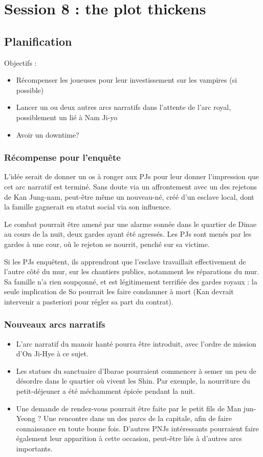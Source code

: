 \documentclass[10pt,a4paper]{book}
\begin{document}
\section{Session 8 : the plot thickens}
\subsection{Planification}
Objectifs :
\begin{itemize}
\item Récompenser les joueuses pour leur investissement sur les vampires (si possible)
\item Lancer un ou deux autres arcs narratifs dans l'attente de l'arc royal, possiblement un lié à Nam Ji-yo
\item Avoir un downtime?
\end{itemize}

\subsubsection{Récompense pour l'enquête}
L'idée serait de donner un os à ronger aux PJs pour leur donner l'impression que cet arc narratif est terminé. Sans doute via un affrontement avec un des rejetons de Kan Jung-nam, peut-être même un nouveau-né, créé d'un esclave local, dont la famille gagnerait en statut social via son influence. 

Le combat pourrait être amené par une alarme sonnée dans le quartier de Dinae au cours de la nuit, deux gardes ayant été agressés. Les PJs sont menés par les gardes à une cour, où le rejeton se nourrit, penché sur sa victime.

Si les PJs enquêtent, ils apprendront que l'esclave travaillait effectivement de l'autre côté du mur, sur les chantiers publics, notamment les réparations du mur. Sa famille n'a rien soupçonné, et est légitimement terrifiée des gardes royaux : la seule implication de So pourrait les faire condamner à mort (Kan devrait intervenir a pasteriori pour régler sa part du contrat).

\subsubsection{Nouveaux arcs narratifs}
\begin{itemize}
\item L'arc narratif du manoir hanté pourra être introduit, avec l'ordre de mission d'On Ji-Hye à ce sujet.
\item Les statues du sanctuaire d'Ibarae pourraient commencer à semer un peu de désordre dans le quartier où vivent les Shin. Par exemple, la nourriture du petit-déjeuner a été méchamment épicée pendant la nuit.
\item Une demande de rendez-vous pourrait être faite par le petit fils de Man jun-Yeong ? Une rencontre dans un des parcs de la capitale, afin de faire connaissance en toute bonne fois. D'autres PNJs intéressants pourraient faire également leur apparition à cette occasion, peut-être liés à d'autres arcs importants.
\end{itemize}
\end{document}
